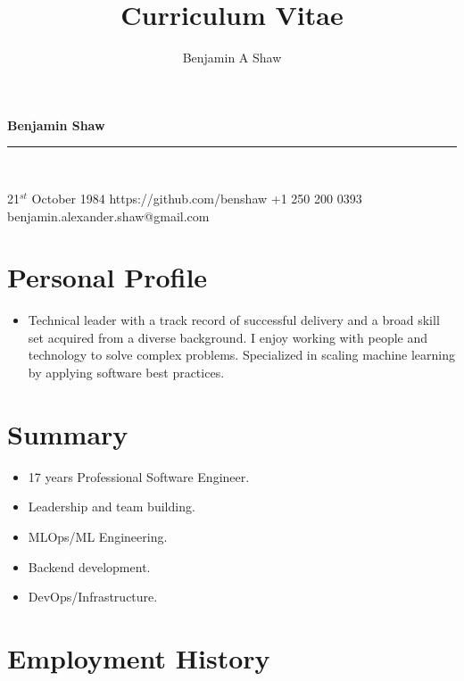 \documentclass{article}
\title{Curriculum Vitae}
\author{Benjamin A Shaw}
\begin{document}
{\huge{\color{slateblue}\textbf{Benjamin Shaw}}}\\
\rule{\textwidth}{0.5mm}\\

\begin{personaldetails}
{21$^{st}$ October 1984}
{https://github.com/benshaw}
{+1 250 200 0393}
{benjamin.alexander.shaw@gmail.com}
\end{personaldetails}


\section*{Personal Profile}
\begin{itemize}
  \item Technical leader with a track record of successful delivery and a broad skill set acquired from a diverse background. I enjoy working with people and technology to solve complex problems. Specialized in scaling machine learning by applying software best practices.
\end{itemize}

\section*{Summary}
\begin{itemize}
  \item 17 years Professional Software Engineer.
  \item Leadership and team building.
  \item MLOps/ML Engineering.
  \item Backend development.
  \item DevOps/Infrastructure.
\end{itemize}

\section*{Employment History}
\end{document}
